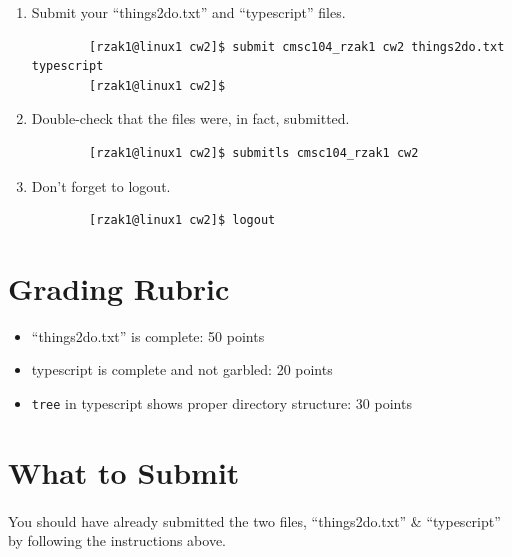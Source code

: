\documentclass[letter,11pt]{article}
\begin{document}
\begin{enumerate}
\begin{verbatim}
        [rzak1@linux1 cw2]$ cat typescript
        NOTE: The contents of your file (the commands you’ve
        just executed and their results) should display here.
        [rzak1@linux1 cw2]$
    \end{verbatim}
    \item Submit your ``things2do.txt'' and ``typescript'' files.
    \begin{verbatim}
        [rzak1@linux1 cw2]$ submit cmsc104_rzak1 cw2 things2do.txt typescript
        [rzak1@linux1 cw2]$
    \end{verbatim}
    \item Double-check that the files were, in fact, submitted.
    \begin{verbatim}
        [rzak1@linux1 cw2]$ submitls cmsc104_rzak1 cw2
    \end{verbatim}
    \item Don’t forget to logout.
    \begin{verbatim}
        [rzak1@linux1 cw2]$ logout
    \end{verbatim}
\end{enumerate}

\section*{Grading Rubric}
\begin{itemize}
    \item ``things2do.txt'' is complete: 50 points
    \item typescript is complete and not garbled: 20 points
    \item \texttt{tree} in typescript shows proper directory structure: 30 points
\end{itemize}

\section*{What to Submit}
\paragraph{}You should have already submitted the two files, ``things2do.txt'' \& ``typescript'' by following the instructions above.
\end{document}
